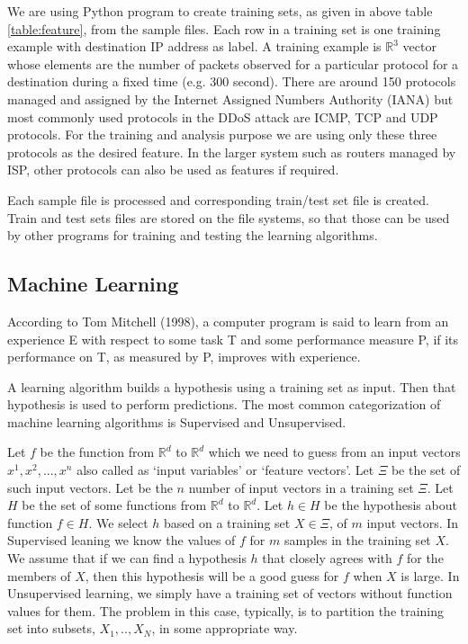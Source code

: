 \documentclass[12pt,oneside,a4paper]{article}
\begin{document}
We are using Python program to create training sets, as given in above table \ref{table:feature}, from the sample files. Each row in a training set is one training example with destination IP address as label. A training example is $\mathbb{R}^3$ vector whose elements are the number of packets observed for a particular protocol for a destination during a fixed time (e.g. 300 second). There are around 150 protocols managed and assigned by the Internet Assigned Numbers Authority (IANA) but most commonly used protocols in the DDoS attack are ICMP, TCP and UDP protocols. For the training and analysis purpose we are using only these three protocols as the desired feature. In the larger system such as routers managed by ISP, other protocols can also be used as features if required.

Each sample file is processed and corresponding train/test set file is created. Train and test sets files are stored on the file systems, so that those can be used by other programs for training and testing the learning algorithms.

\subsection{Machine Learning}

According to Tom Mitchell (1998), a computer program is said to learn from an experience E with respect to some task T and some performance measure P, if its performance on T, as measured by P, improves with experience.

A learning algorithm builds a hypothesis using a training set as input. Then that hypothesis is used to perform predictions. The most common categorization of machine learning algorithms is Supervised and Unsupervised.

Let $f$ be the function from $\mathbb{R}^d$ to $\mathbb{R}^d$ which we need to guess from an input vectors $x^{1}, x^{2}, ..., x^{n}$ also called as `input variables' or `feature vectors'. Let $\Xi$ be the set of such input vectors. Let be the $n$ number of input vectors in a training set $\Xi$. Let $H$ be the set of some functions from $\mathbb{R}^d$ to $\mathbb{R}^d$. Let $h \in H$ be the hypothesis about function $f \in H$. We select $h$ based on a training set $X \in \Xi$, of $m$ input vectors. In Supervised leaning we know the values of $f$ for $m$ samples in the training set $X$. We assume that if we can find a hypothesis $h$ that closely agrees with $f$ for the members of $X$, then this hypothesis will be a good guess for $f$ when $X$ is large. In Unsupervised learning, we simply have a training set of vectors without function values for them. The problem in this case, typically, is to partition the training set into subsets, $X_1,.. ,X_{N}$, in some appropriate way.\cite{machine-learning}
\end{document}
